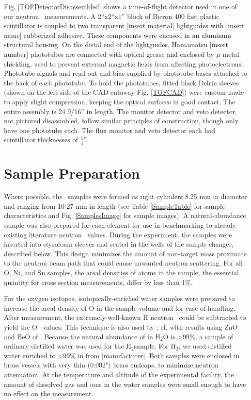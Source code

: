 Fig. \ref{TOFDetectorDisassembled} shows a time-of-flight detector used in one
of our
neutron \tot\ measurements. A 2``x2``x1'' block of Bicron 400 fast plastic scintillator is coupled to two transparent
[insert material] lightguides with [insert name] rubberized adhesive. These components were encased
in an aluminum structural housing. On the distal end of the lightguides, Hamamatsu [insert number]
phototubes are connected with optical grease and enclosed by
$\mu$-metal shielding, used to prevent external magnetic fields from affecting photoelectrons.
Phototube signals and read out and bias supplied by phototube bases attached to the back of each
phototube. To hold the phototubes, fitted black Delrin sleeves (shown on the
left side of the CAD cutaway Fig. \ref{TOFCAD}) were custom-made to apply slight
compression, keeping the optical surfaces in good contact. The entire assembly
is 24 9/16'' in length. The monitor detector and veto detector, not pictured disassmbled, follow
similar principles of construction, though only have one phototube each. The flux monitor and
veto detector each had scintillator thicknesses of $\frac{1}{4}$''.

\section{Sample Preparation}
Where possible, the \tot\ samples were formed as right
cylinders 8.25 mm in diameter and ranging from 10-27 mm in length (see
Table \ref{SampleTable} for sample characteristics and Fig. \ref{SamplesImage}
for sample images). A natural-abundance sample
was also prepared for each element for use in benchmarking to already-existing
literature neutron \tot\ values. During the experiment, the samples were inserted
into styrofoam sleeves and seated in the wells of the sample
changer, described below. This design minimizes the amount of non-target mass proximate to the
neutron beam path that could cause unwanted neutron scattering. For all O, Ni,
and Sn samples, the areal densities of atoms in the sample, the essential quantity for cross section
measurements, differ by less than 1\%.

For the oxygen isotopes, isotopically-enriched water samples were prepared to
increase the areal density of O in the sample volume and for ease of handling.
After measurement, the
extremely-well-known H neutron \tot\ could be subtracted to yield the O \tot\ values.
This technique is also used by \cite{Vaughn1965, Salisbury1965}; cf.  with
results using ZnO and BeO of \cite{Finlay1993}.
Because the natural abundance of \oSix in H$_{2}$O is >99\%, a sample of
ordinary distilled water was used for the H$_{2}$\oSix sample. For H$_{2}$\oEight,
we used distilled water enriched to >99\% in \oEight from
[manufacturer]. Both samples were enclosed in brass vessels with very thin
(0.002") brass endcaps, to minimize neutron attenuation. At the temperature and
altitude of the experimental facility, the amount of dissolved gas and ions
in the water samples were small enough to have no effect on the measurement.

